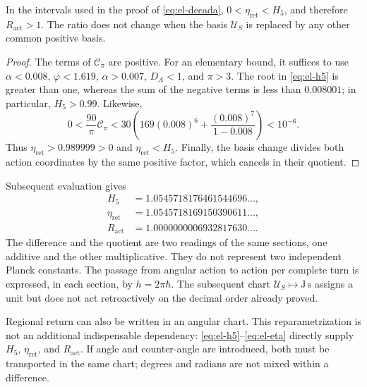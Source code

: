 \begin{proposition}
In the intervals used in the proof of \eqref{eq:el-decada},
\(0<\eta_{\mathrm{ret}}<H_5\), and therefore
\(R_{\mathrm{act}}>1\). The ratio does not change when the basis
\(\mathcal U_S\) is replaced by any other common positive basis.
\end{proposition}
\begin{proof}
The terms of \(\mathcal C_\pi\) are positive. For an elementary
bound, it suffices to use \(\alpha<0.008\), \(\varphi<1.619\),
\(\alpha>0.007\), \(D_A<1\), and \(\pi>3\). The root in
\eqref{eq:el-h5} is greater than one, whereas the sum of the negative
terms is less than \(0.008001\); in particular, \(H_5>0.99\).
Likewise,
\[
 0<\frac{90}{\pi}\mathcal C_\pi
 <30\left(169(0.008)^6+
           \frac{(0.008)^7}{1-0.008}\right)<10^{-6}.
\]
Thus \(\eta_{\mathrm{ret}}>0.989999>0\) and
\(\eta_{\mathrm{ret}}<H_5\). Finally, the basis change divides
both action coordinates by the same positive factor, which cancels in
their quotient.
\end{proof}

Subsequent evaluation gives
\begin{align*}
 H_5&=1.0545718176461544696\ldots,\\
 \eta_{\mathrm{ret}}&=1.0545718169150390611\ldots,\\
 R_{\mathrm{act}}&=1.0000000006932817630\ldots.
\end{align*}
The difference and the quotient are two readings of the same sections,
one additive and the other multiplicative. They do not represent two independent
Planck constants. The passage from angular action to action per complete
turn is expressed, in each section, by
\(h=2\pi\hbar\). The subsequent chart
\(\mathcal U_S\mapsto\mathrm{J\,s}\) assigns a unit but does not
act retroactively on the decimal order already proved.

Regional return can also be written in an angular chart.
This reparametrization is not an additional indispensable dependency:
\eqref{eq:el-h5}--\eqref{eq:el-eta} directly supply
\(H_5\), \(\eta_{\mathrm{ret}}\), and \(R_{\mathrm{act}}\). If
angle and counter-angle are introduced, both must be transported in the same
chart; degrees and radians are not mixed within a difference.


